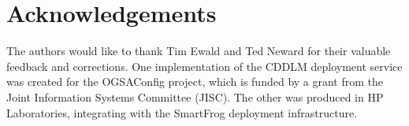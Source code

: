 \section{Acknowledgements}
The authors would like to thank Tim Ewald and Ted Neward for their
valuable feedback and corrections. One implementation of the CDDLM
deployment service was created for the OGSAConfig project, which is
funded by a grant from the Joint Information Systems Committee
(JISC). The other was produced in HP Laboratories, integrating
with the SmartFrog deployment infrastructure.
